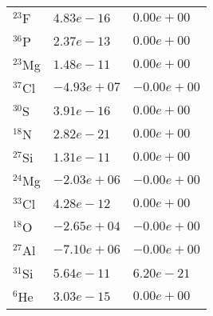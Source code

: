 \begin{tabular}{lll}
 $^{23}$F  & $4.83e-16 $                                                        & $0.00e+00 $                                                                     \\
 $^{36}$P  & $2.37e-13 $                                                        & $0.00e+00 $                                                                     \\
 $^{23}$Mg & $1.48e-11 $                                                        & $0.00e+00 $                                                                     \\
 $^{37}$Cl & $-4.93e+07 $                                                       & $-0.00e+00 $                                                                    \\
 $^{30}$S  & $3.91e-16 $                                                        & $0.00e+00 $                                                                     \\
 $^{18}$N  & $2.82e-21 $                                                        & $0.00e+00 $                                                                     \\
 $^{27}$Si & $1.31e-11 $                                                        & $0.00e+00 $                                                                     \\
 $^{24}$Mg & $-2.03e+06 $                                                       & $-0.00e+00 $                                                                    \\
 $^{33}$Cl & $4.28e-12 $                                                        & $0.00e+00 $                                                                     \\
 $^{18}$O  & $-2.65e+04 $                                                       & $-0.00e+00 $                                                                    \\
 $^{27}$Al & $-7.10e+06 $                                                       & $-0.00e+00 $                                                                    \\
 $^{31}$Si & $5.64e-11 $                                                        & $6.20e-21 $                                                                     \\
 $^{6}$He  & $3.03e-15 $                                                        & $0.00e+00 $                                                                     \\

\end{tabular}
